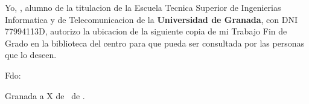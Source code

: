 
\thispagestyle{empty}

\vspace*{3cm}
\noindent Yo, \textbf{\tfgautor}, alumno de la titulacion \textbf{\tfgtitulacion} de la Escuela Tecnica Superior de Ingenierias Informatica y de Telecomunicacion de la \textbf{Universidad de Granada}, con DNI 77994113D, autorizo la ubicacion de la siguiente copia de mi Trabajo Fin de Grado en la biblioteca del centro para que pueda ser consultada por las personas que lo deseen.

\vspace{2.5cm}
\noindent Fdo: \tfgautor

\vspace{2.5cm}
\noindent Granada a X de \tfgmes\ de \tfganio.

\cleardoublepage
